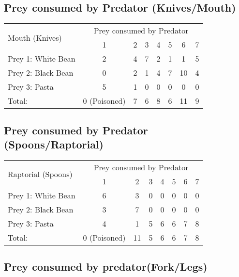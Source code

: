 \documentclass{scrartcl}
\begin{document}
\subsection{Prey consumed by Predator (Knives/Mouth)}
\begin{table}[H]
\centering
\begin{tabular}{|l|c|c|c|c|c|c|c|}
\hline
    \multirow{2}{*}{Mouth (Knives)} & \multicolumn{7}{c|}{Prey consumed by Predator} \\
    \cline{2-8}
     & 1 & 2 & 3 & 4 & 5 & 6 & 7 \\
    \hline \hline
    Prey 1: White Bean & 2 & 4 & 7 & 2 & 1 & 1 & 5\\ 
    \hline
    Prey 2: Black Bean & 0 & 2 & 1 & 4 & 7 & 10 & 4\\
    \hline
    Prey 3: Pasta & 5 & 1 & 0 & 0 & 0 & 0 & 0\\
    \hline
    Total:        & 0 (Poisoned) & 7 & 6 & 8 & 6 & 11 & 9\\
    \hline
\end{tabular}
\end{table}

\subsection{Prey consumed by Predator (Spoons/Raptorial)}
\begin{table}[H]
\centering
\begin{tabular}{|l|c|c|c|c|c|c|c|}
\hline
    \multirow{2}{*}{Raptorial (Spoons)} & \multicolumn{7}{c|}{Prey consumed by Predator} \\
    \cline{2-8}
     & 1 & 2 & 3 & 4 & 5 & 6 & 7 \\
    \hline \hline
    Prey 1: White Bean & 6 & 3 & 0 & 0 & 0 & 0 & 0\\ 
    \hline
    Prey 2: Black Bean & 3 & 7 & 0 & 0 & 0 & 0 & 0\\
    \hline
    Prey 3: Pasta & 4 & 1 & 5 & 6 & 6 & 7 & 8\\
    \hline
     Total:       & 0 (Poisoned) & 11 & 5 & 6 & 6 & 7 & 8\\
     \hline
\end{tabular}
\end{table}

\subsection{Prey consumed by predator(Fork/Legs)}
\end{document}
